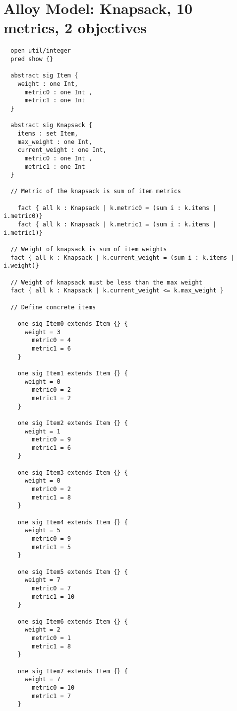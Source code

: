 \section{Alloy Model: Knapsack, 10 metrics, 2 objectives}\label{app:knapsack}
\begin{verbatim}
  open util/integer
  pred show {}
  
  abstract sig Item {
    weight : one Int,    
      metric0 : one Int ,    
      metric1 : one Int     
  }

  abstract sig Knapsack {
    items : set Item,
    max_weight : one Int,
    current_weight : one Int,    
      metric0 : one Int ,    
      metric1 : one Int 
  }

  // Metric of the knapsack is sum of item metrics
  
    fact { all k : Knapsack | k.metric0 = (sum i : k.items | i.metric0)}
    fact { all k : Knapsack | k.metric1 = (sum i : k.items | i.metric1)}
  
  // Weight of knapsack is sum of item weights
  fact { all k : Knapsack | k.current_weight = (sum i : k.items | i.weight)}
  
  // Weight of knapsack must be less than the max weight
  fact { all k : Knapsack | k.current_weight <= k.max_weight }

  // Define concrete items
  
    one sig Item0 extends Item {} {
      weight = 3      
        metric0 = 4       
        metric1 = 6       
    }
  
    one sig Item1 extends Item {} {
      weight = 0      
        metric0 = 2       
        metric1 = 2       
    }
  
    one sig Item2 extends Item {} {
      weight = 1      
        metric0 = 9       
        metric1 = 6       
    }
  
    one sig Item3 extends Item {} {
      weight = 0      
        metric0 = 2       
        metric1 = 8       
    }
  
    one sig Item4 extends Item {} {
      weight = 5      
        metric0 = 9       
        metric1 = 5       
    }
  
    one sig Item5 extends Item {} {
      weight = 7      
        metric0 = 7       
        metric1 = 10       
    }
  
    one sig Item6 extends Item {} {
      weight = 2      
        metric0 = 1       
        metric1 = 8      
    }
  
    one sig Item7 extends Item {} {
      weight = 7      
        metric0 = 10       
        metric1 = 7       
    }
  

\end{verbatim}
